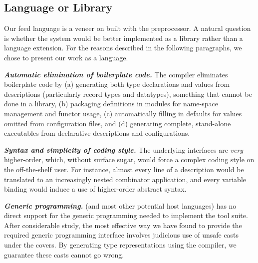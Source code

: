 \subsection{Language or Library}
Our feed language is a veneer on \ocaml{} built with the \camlp{}
preprocessor.   
A natural question is whether the system would be better
implemented as a library rather than a language extension.  For the reasons
described in the following paragraphs, we chose to present our work as a
language. 

\textbf{\textit{Automatic elimination of boilerplate code.}}
The compiler eliminates boilerplate code by
(a) generating both type declarations and values from 
descriptions (particularly record types and datatypes), something
that cannot be done in a library, (b) packaging definitions
in modules for name-space management and functor usage, 
(c) automatically filling in defaults for values omitted from
configuration files, and (d) generating complete, stand-alone executables from
declarative descriptions and configurations. 

\textbf{\textit{Syntax and simplicity of coding style.}}  The underlying
interfaces are {\em very} higher-order, which, without surface sugar,
would force a complex coding style on the off-the-shelf user.
For instance, almost every line of a description would be translated
to an increasingly nested combinator application, and every variable binding
would induce a use of higher-order abstract syntax. 

\textbf{\textit{Generic programming.}} \ocaml{} (and most other 
potential host languages)
has no direct support for
the generic programming needed to implement the tool suite.  After considerable
study, the most effective way we have found to provide the required 
generic programming interface involves judicious use of unsafe casts
under the covers.  By generating type representations using the compiler,
we guarantee these casts cannot go wrong.



